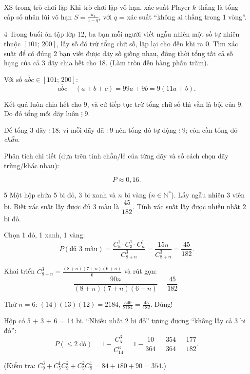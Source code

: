 \begin{meobotui}{XS trong trò chơi lặp}
Khi trò chơi lặp vô hạn, xác suất Player $k$ thắng là tổng cấp số nhân lùi vô hạn $S = \frac{u_1}{1-q}$, với $q$ = xác suất ``không ai thắng trong 1 vòng''.
\end{meobotui}

\separator

\begin{baitoan}{4 \hfill {}}
Trong buổi ôn tập lớp 12, ba bạn mỗi người viết ngẫu nhiên một số tự nhiên thuộc $[101;\,200]$, lấy số đó trừ tổng chữ số, lặp lại cho đến khi ra 0. Tìm xác suất để có đúng 2 bạn viết được dãy số giống nhau, đồng thời tổng tất cả số hạng của cả 3 dãy chia hết cho 18. (Làm tròn đến hàng phần trăm).
\end{baitoan}

\begin{loigiai}
Với số $\overline{abc} \in [101;\,200]$:
\[ \overline{abc} - (a+b+c) = 99a + 9b = 9(11a+b). \]

Kết quả luôn chia hết cho 9, và cứ tiếp tục trừ tổng chữ số thì vẫn là bội của 9. Do đó tổng mỗi dãy luôn $\vdots\;9$.

Để tổng 3 dãy $\vdots\;18$: vì mỗi dãy đã $\vdots\;9$ nên tổng đó tự động $\vdots\;9$; còn cần tổng đó \textit{chẵn}.

Phân tích chi tiết (dựa trên tính chẵn/lẻ của từng dãy và số cách chọn dãy trùng/khác nhau):

\[ P \approx \boxed{0{,}16}. \]
\end{loigiai}

\separator

\begin{baitoan}{5 \hfill {}}
Một hộp chứa 5 bi đỏ, 3 bi xanh và $n$ bi vàng ($n \in \mathbb{N}^*$). Lấy ngẫu nhiên 3 viên bi. Biết xác suất lấy được đủ 3 màu là $\dfrac{45}{182}$. Tính xác suất lấy được nhiều nhất 2 bi đỏ.
\end{baitoan}

\begin{loigiai}
Chọn 1 đỏ, 1 xanh, 1 vàng:
\[ P(\text{đủ 3 màu}) = \frac{C_5^1 \cdot C_3^1 \cdot C_n^1}{C_{8+n}^3} = \frac{15n}{C_{8+n}^3} = \frac{45}{182}. \]

Khai triển $C_{8+n}^3 = \frac{(8+n)(7+n)(6+n)}{6}$ và rút gọn:
\[ \frac{90n}{(8+n)(7+n)(6+n)} = \frac{45}{182}. \]

Thử $n = 6$: $(14)(13)(12) = 2184$, $\frac{540}{2184} = \frac{45}{182}$. Đúng!

Hộp có 5 + 3 + 6 = 14 bi. ``Nhiều nhất 2 bi đỏ'' tương đương ``không lấy cả 3 bi đỏ'':
\[ P(\le 2\;\text{đỏ}) = 1 - \frac{C_5^3}{C_{14}^3} = 1 - \frac{10}{364} = \frac{354}{364} = \boxed{\frac{177}{182}}. \]

(Kiểm tra: $C_9^3 + C_5^1 C_9^2 + C_5^2 C_9^1 = 84 + 180 + 90 = 354$.)
\end{loigiai}

